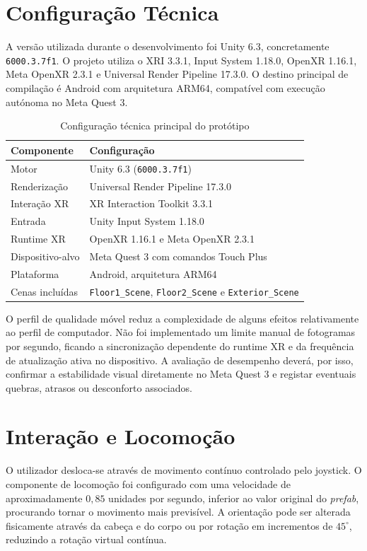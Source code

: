 \documentclass[12pt,a4paper,oneside]{report}
\begin{document}
\section{Configuração Técnica}

A versão utilizada durante o desenvolvimento foi Unity 6.3, concretamente \texttt{6000.3.7f1}. O projeto utiliza o \ac{XRI} 3.3.1, Input System 1.18.0, OpenXR 1.16.1, Meta OpenXR 2.3.1 e Universal Render Pipeline 17.3.0. O destino principal de compilação é Android com arquitetura ARM64, compatível com execução autónoma no Meta Quest 3.

\begin{table}[H]
\centering
\caption{Configuração técnica principal do protótipo}
\label{tab:configuracao-tecnica}
\begin{tabular}{p{5cm}p{8cm}}
\toprule
\textbf{Componente} & \textbf{Configuração} \\
\midrule
Motor & Unity 6.3 (\texttt{6000.3.7f1}) \\
Renderização & Universal Render Pipeline 17.3.0 \\
Interação XR & XR Interaction Toolkit 3.3.1 \\
Entrada & Unity Input System 1.18.0 \\
Runtime XR & OpenXR 1.16.1 e Meta OpenXR 2.3.1 \\
Dispositivo-alvo & Meta Quest 3 com comandos Touch Plus \\
Plataforma & Android, arquitetura ARM64 \\
Cenas incluídas & \texttt{Floor1\_Scene}, \texttt{Floor2\_Scene} e \texttt{Exterior\_Scene} \\
\bottomrule
\end{tabular}
\end{table}

O perfil de qualidade móvel reduz a complexidade de alguns efeitos relativamente ao perfil de computador. Não foi implementado um limite manual de fotogramas por segundo, ficando a sincronização dependente do runtime XR e da frequência de atualização ativa no dispositivo. A avaliação de desempenho deverá, por isso, confirmar a estabilidade visual diretamente no Meta Quest 3 e registar eventuais quebras, atrasos ou desconforto associados.

\section{Interação e Locomoção}

O utilizador desloca-se através de movimento contínuo controlado pelo joystick. O componente de locomoção foi configurado com uma velocidade de aproximadamente \(0{,}85\) unidades por segundo, inferior ao valor original do \textit{prefab}, procurando tornar o movimento mais previsível. A orientação pode ser alterada fisicamente através da cabeça e do corpo ou por rotação em incrementos de \(45^\circ\), reduzindo a rotação virtual contínua.
\end{document}
